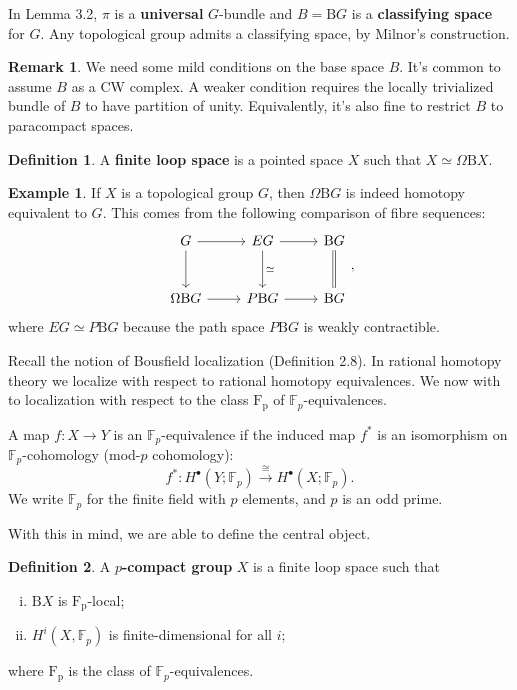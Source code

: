 \documentclass[psamsfonts]{amsart}
\theoremstyle{definition}
\newtheorem{defn}{Definition}[section]
\newtheorem{exmp}{Example}[section]
\newtheorem{rem}{Remark}[section]
\newcommand{\F}{\mathbb{F}}
\newcommand{\B}{\mathrm{B}}
\numberwithin{equation}{section}
\begin{document}
In Lemma 3.2, $\pi$ is a \textbf{universal} $G$-bundle and $B=\B G$ is a \textbf{classifying space} for $G$. Any topological group admits a classifying space, by Milnor's construction.

\begin{rem}
We need some mild conditions on the base space $B$. It's common to assume $B$ as a CW complex. A weaker condition requires the locally trivialized bundle of $B$ to have partition of unity. Equivalently, it's also fine to restrict $B$ to paracompact spaces.
\end{rem}

\begin{defn}
A \textbf{finite loop space} is a pointed space $X$ such that $X\simeq\Omega\B X$.
\end{defn}

\begin{exmp}
If $X$ is a topological group $G$, then $\Omega\B G$ is indeed homotopy equivalent to $G$. This comes from the following comparison of fibre sequences:
\[\begin{tikzcd}[row sep=large]
G\arrow[r]\arrow[d]&EG\arrow[r]\arrow[d,"\simeq"]&\B G\arrow[d,equal]\\
\Omega\B G\arrow[r]&P\B G\arrow[r]&\B G
\end{tikzcd},\]
where $EG\simeq P\B G$ because the path space $P\B G$ is weakly contractible.
\end{exmp}

Recall the notion of Bousfield localization (Definition 2.8). In rational homotopy theory we localize with respect to rational homotopy equivalences. We now with to localization with respect to the class $\mathrm{F_p}$ of $\F_p$-equivalences.

A map $f:X\to Y$ is an $\F_p$-equivalence if the induced map $f^\ast$ is an isomorphism on $\F_p$-cohomology (mod-$p$ cohomology):
\[f^\ast:H^\bullet(Y;\F_p)\xrightarrow{\ \cong\ } H^\bullet(X;\F_p).\]
We write $\F_p$ for the finite field with $p$ elements, and $p$ is an odd prime.
\bigbreak

With this in mind, we are able to define the central object.

\begin{defn}
A \textbf{$p$-compact group} $X$ is a finite loop space such that\begin{enumerate}[(i)]
    \item $\B X$ is $\mathrm{F_p}$-local;
    \item $H^i(X,\F_p)$ is finite-dimensional for all $i$;
\end{enumerate}
where $\mathrm{F_p}$ is the class of $\F_p$-equivalences.
\end{defn}
\end{document}
